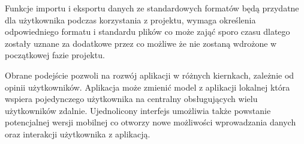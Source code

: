 \documentclass[a4paper,10pt, twoside]{report}
\begin{document}
{Funkcje importu i eksportu danych ze standardowych formatów będą przydatne dla 
użytkownika podczas korzystania z projektu, wymaga określenia odpowiedniego 
formatu i standardu plików co może zająć sporo czasu dlatego zostały uznane za 
dodatkowe przez co możliwe że nie zostaną wdrożone w początkowej fazie projektu.}

{Obrane podejście pozwoli na rozwój aplikacji w różnych kiernkach, zależnie od 
opinii użytkowników. Aplikacja może zmienić model z aplikacji lokalnej która 
wspiera pojedynczego użytkownika na centralny obsługujących wielu użytkowników 
zdalnie. Ujednolicony interfejs umożliwia także powstanie potencjalnej wersji 
mobilnej co otworzy nowe możliwości wprowadzania danych oraz interakcji 
użytkownika z aplikacją.}
\end{document}
